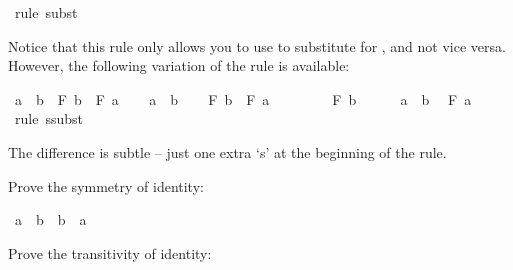 \begin{isabellebody}
\ {\isacharparenleft}rule\ subst{\isacharparenright}\isanewline
\ \ \isamarkupfalse%
\isanewline
{}\isamarkupfalse%
%
\endisatagproof
{\isafoldproof}%
%
\isadelimproof
%
\endisadelimproof
%
\begin{isamarkuptext}%
Notice that this rule only allows you to use  to substitute  for
, and not vice versa. However, the following variation of the rule is available:%
\end{isamarkuptext}\isamarkuptrue%
\isamarkupfalse%
\ {\isachardoublequoteopen}a\ {\isacharequal}\ b\ {\isasymlongrightarrow}\ F\ b\ {\isasymlongrightarrow}\ F\ a{\isachardoublequoteclose}\isanewline
%
\isadelimproof
%
\endisadelimproof
%
\isatagproof
{}\isamarkupfalse%
\isanewline
\ \ \isamarkupfalse%
\ {\isachardoublequoteopen}a\ {\isacharequal}\ b{\isachardoublequoteclose}\isanewline
\ \ \isamarkupfalse%
\ {\isachardoublequoteopen}F\ b\ {\isasymlongrightarrow}\ F\ a{\isachardoublequoteclose}\isanewline
\ \ \isamarkupfalse%
\isanewline
\ \ \ \ \isamarkupfalse%
\ {\isachardoublequoteopen}F\ b{\isachardoublequoteclose}\isanewline
\ \ \ \ \isamarkupfalse%
\ {\isacharbackquoteopen}a\ {\isacharequal}\ b{\isacharbackquoteclose}\ \isamarkupfalse%
\ {\isachardoublequoteopen}F\ a{\isachardoublequoteclose}\ \isamarkupfalse%
\ {\isacharparenleft}rule\ ssubst{\isacharparenright}\isanewline
\ \ \isamarkupfalse%
\isanewline
{}\isamarkupfalse%
%
\endisatagproof
{\isafoldproof}%
%
\isadelimproof
%
\endisadelimproof
%
\begin{isamarkuptext}%
The difference is subtle -- just one extra `s' at the beginning of the rule.%
\end{isamarkuptext}\isamarkuptrue%
%
\begin{isamarkuptext}%
\begin{Exercise} Prove the symmetry of identity: \end{Exercise}%
\end{isamarkuptext}\isamarkuptrue%
\isamarkupfalse%
\ {\isachardoublequoteopen}a\ {\isacharequal}\ b\ {\isasymlongrightarrow}\ b\ {\isacharequal}\ a{\isachardoublequoteclose}%
\isadelimproof
\ %
\endisadelimproof
%
\isatagproof
{}\isamarkupfalse%
%
\endisatagproof
{\isafoldproof}%
%
\isadelimproof
%
\endisadelimproof
%
\begin{isamarkuptext}%
\begin{Exercise} Prove the transitivity of identity: \end{Exercise}%

\end{isamarkuptext}
\end{isabellebody}
